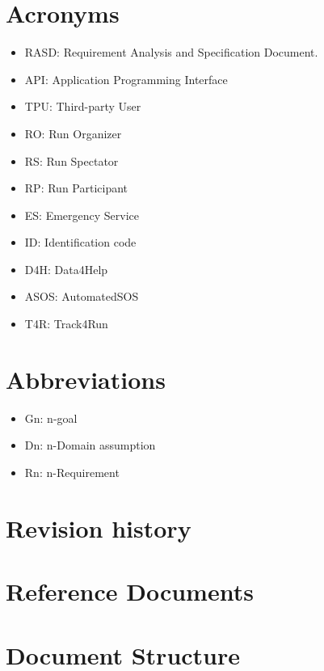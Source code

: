 \section{Acronyms}
\begin{itemize}
\item RASD: Requirement Analysis and Specification Document. 
\item API: Application Programming Interface
\item TPU: Third-party User
\item RO: Run Organizer 
\item	RS: Run Spectator 
\item	RP: Run Participant 
\item	ES: Emergency Service 
\item	ID: Identification code
\item	D4H: Data4Help
\item	ASOS: AutomatedSOS
\item	T4R: Track4Run
\end{itemize}

\section{Abbreviations}
\begin{itemize}
\item Gn: n-goal
\item Dn: n-Domain assumption
\item Rn: n-Requirement
\end{itemize}

\section{Revision history}
\section{Reference Documents }
\section{Document Structure}

